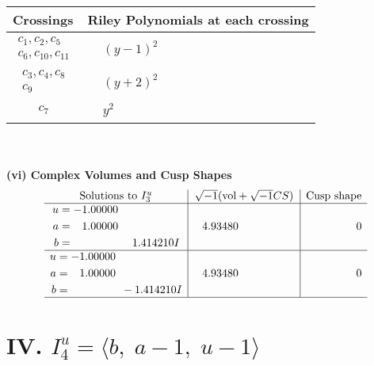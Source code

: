 \documentclass[1p]{elsarticle_modified}
\theoremstyle{definition}
\newcommand{\I}{\sqrt{-1}}
\begin{document}
\begin{tabular}{m{50pt}|m{274pt}}
Crossings & \hspace{64pt}Riley Polynomials at each crossing \\
\hline $$\begin{aligned}c_{1},c_{2},c_{5}\\c_{6},c_{10},c_{11}\end{aligned}$$&$\begin{aligned}
&(y-1)^2
\end{aligned}$\\
\hline $$\begin{aligned}c_{3},c_{4},c_{8}\\c_{9}\end{aligned}$$&$\begin{aligned}
&(y+2)^2
\end{aligned}$\\
\hline $$\begin{aligned}c_{7}\end{aligned}$$&$\begin{aligned}
&y^2
\end{aligned}$\\
\hline
\end{tabular}\\~\\
\newpage\flushleft \textbf{(vi) Complex Volumes and Cusp Shapes}
$$\begin{array}{c|c|c}  
\text{Solutions to }I^u_{3}& \I (\text{vol} + \sqrt{-1}CS) & \text{Cusp shape}\\
 \hline 
\begin{aligned}
u &= -1.00000\phantom{ +0.000000I} \\
a &= \phantom{-}1.00000\phantom{ +0.000000I} \\
b &= \phantom{-0.000000 -}1.414210 I\end{aligned}
 & \phantom{-}4.93480\phantom{ +0.000000I} & \phantom{-0.000000 } 0 \\ \hline\begin{aligned}
u &= -1.00000\phantom{ +0.000000I} \\
a &= \phantom{-}1.00000\phantom{ +0.000000I} \\
b &= \phantom{-0.000000 } -1.414210 I\end{aligned}
 & \phantom{-}4.93480\phantom{ +0.000000I} & \phantom{-0.000000 } 0\\
 \hline 
 \end{array}$$\newpage\newpage\renewcommand{\arraystretch}{1}
\centering \section*{IV. $I^u_{4}= \langle b,\;a-1,\;u-1 \rangle$}
\end{document}
